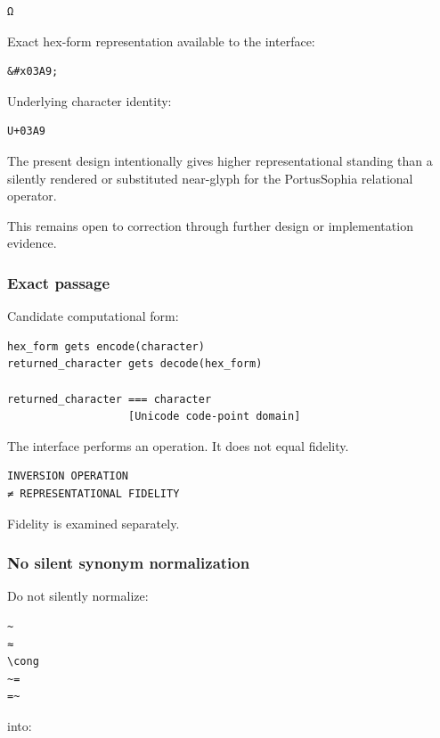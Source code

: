 \begin{verbatim}
Ω
\end{verbatim}

Exact hex-form representation available to the interface:

\begin{verbatim}
&#x03A9;
\end{verbatim}

Underlying character identity:

\begin{verbatim}
U+03A9
\end{verbatim}

The present design intentionally gives \texttt{} higher
representational standing than a silently rendered or substituted
near-glyph for the PortusSophia relational operator.

This remains open to correction through further design or implementation
evidence.

\subsubsection{Exact passage}\label{exact-passage}

Candidate computational form:

\begin{verbatim}
hex_form gets encode(character)
returned_character gets decode(hex_form)

returned_character === character
                   [Unicode code-point domain]
\end{verbatim}

The interface performs an operation. It does not equal fidelity.

\begin{verbatim}
INVERSION OPERATION
≠ REPRESENTATIONAL FIDELITY
\end{verbatim}

Fidelity is examined separately.

\subsubsection{No silent synonym
normalization}\label{no-silent-synonym-normalization}

Do not silently normalize:

\begin{verbatim}
~
≈
\cong
~=
=~
\end{verbatim}

into:

